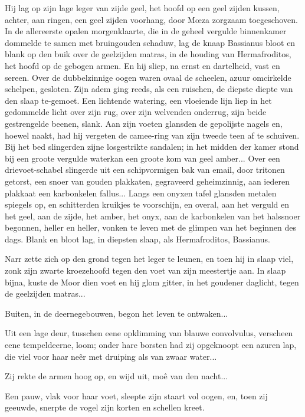 \documentclass[a4paper, 12pt, oneside, dutch]{article}
\begin{document}
Hij lag op zijn lage leger van zijde geel, het hoofd op een geel zijden kussen, achter, aan ringen, een geel zijden voorhang, door Mœza zorgzaam toegeschoven. In de allereerste opalen morgenklaarte, die in de geheel vergulde binnenkamer dommelde te samen met bruingouden schaduw, lag de knaap Bassianus bloot en blank op den buik over de geelzijden matras, in de houding van Hermafroditos, het hoofd op de gebogen armen. En hij sliep, na ernst en dartelheid, vast en sereen. Over de dubbelzinnige oogen waren ovaal de scheelen, azuur omcirkelde schelpen, gesloten. Zijn adem ging reeds, als een ruischen, de diepste diepte van den slaap te-gemoet. Een lichtende watering, een vloeiende lijn liep in het gedommelde licht over zijn rug, over zijn welvenden onderrug, zijn beide gestrengelde beenen, slank. Aan zijn voeten glansden de gepolijste nagels en, hoewel naakt, had hij vergeten de camee-ring van zijn tweede teen af te schuiven. Bij het bed slingerden zijne losgestrikte sandalen; in het midden der kamer stond bij een groote vergulde waterkan een groote kom van geel amber... Over een drievoet-schabel slingerde uit een schipvormigen bak van email, door tritonen getorst, een snoer van gouden plakkaten, gegraveerd geheimzinnig, aan iederen plakkaat een karbonkelen fallus... Langs een onyxen tafel glansden metalen spiegels op, en schitterden kruikjes te voorschijn, en overal, aan het verguld en het geel, aan de zijde, het amber, het onyx, aan de karbonkelen van het halssnoer begonnen, heller en heller, vonken te leven met de glimpen van het beginnen des dags. Blank en bloot lag, in diepsten slaap, als Hermafroditos, Bassianus.

Narr zette zich op den grond tegen het leger te leunen, en toen hij in slaap viel, zonk zijn zwarte kroezehoofd tegen den voet van zijn meestertje aan. In slaap bijna, kuste de Moor dien voet en hij glom gitter, in het goudener daglicht, tegen de geelzijden matras...

Buiten, in de deernegebouwen, begon het leven te ontwaken...

Uit een lage deur, tusschen eene opklimming van blauwe convolvulus, verscheen eene tempeldeerne, loom; onder hare borsten had zij opgeknoopt een azuren lap, die viel voor haar neêr met druiping als van zwaar water...

Zij rekte de armen hoog op, en wijd uit, moê van den nacht...

Een pauw, vlak voor haar voet, sleepte zijn staart vol oogen, en, toen zij geeuwde, snerpte de vogel zijn korten en schellen kreet.
\end{document}
